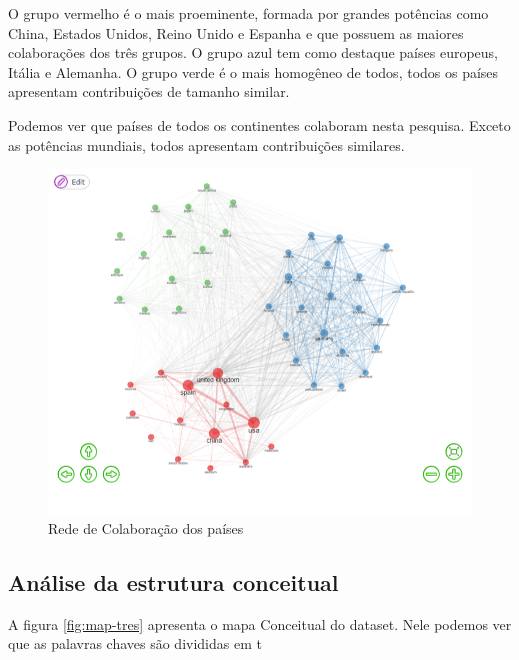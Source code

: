 O grupo vermelho é o mais proeminente, formada por grandes potências como China, Estados Unidos, Reino Unido e Espanha e que possuem as maiores colaborações dos três grupos. O grupo azul tem como destaque países europeus, Itália e Alemanha. O grupo verde é o mais homogêneo de todos, todos os países apresentam contribuições de tamanho similar.

Podemos ver que países de todos os continentes colaboram nesta pesquisa. Exceto as potências mundiais, todos apresentam contribuições similares.

\begin{figure}[ht]
    \centering
    \includegraphics[width=12cm]{experiments/Tong00020/PesquisaBibliometrica/Social Structure/MASSA@Tong00020-Collaboration Network.png}
    \caption{Rede de Colaboração dos países}
    \label{fig:rede-tres}
\end{figure}

\subsection{Análise da estrutura conceitual}

A figura \ref{fig:map-tres} apresenta o mapa Conceitual do dataset. Nele podemos ver que as palavras chaves são divididas em t

